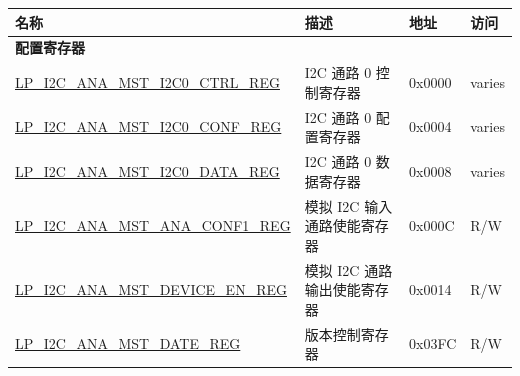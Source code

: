 \begin{longtable}{ | p{6cm} | p{7cm} | p{1.3cm} | p{1cm} | }
\hline\rowcolor{lightgray}
名称 & 描述 &  地址 & 访问 \\ \hline
\endhead
\multicolumn{4}{|l|}{\textbf{配置寄存器}} \\ \hline
\hyperref[regdesc:LPI2CANAMSTI2C0CTRLREG]{LP\_I2C\_ANA\_MST\_I2C0\_CTRL\_REG} & I2C 通路 0 控制寄存器 & 0x0000 & varies \\ \hline
\hyperref[regdesc:LPI2CANAMSTI2C0CONFREG]{LP\_I2C\_ANA\_MST\_I2C0\_CONF\_REG} & I2C 通路 0 配置寄存器 & 0x0004 & varies \\ \hline
\hyperref[regdesc:LPI2CANAMSTI2C0DATAREG]{LP\_I2C\_ANA\_MST\_I2C0\_DATA\_REG} & I2C 通路 0 数据寄存器 & 0x0008 & varies \\ \hline
\hyperref[regdesc:LPI2CANAMSTANACONF1REG]{LP\_I2C\_ANA\_MST\_ANA\_CONF1\_REG} & 模拟 I2C 输入通路使能寄存器 & 0x000C & R/W \\ \hline
\hyperref[regdesc:LPI2CANAMSTDEVICEENREG]{LP\_I2C\_ANA\_MST\_DEVICE\_EN\_REG} & 模拟 I2C 通路输出使能寄存器 & 0x0014 & R/W \\ \hline
\hyperref[regdesc:LPI2CANAMSTDATEREG]{LP\_I2C\_ANA\_MST\_DATE\_REG} & 版本控制寄存器 & 0x03FC & R/W \\ \hline
\end{longtable}
